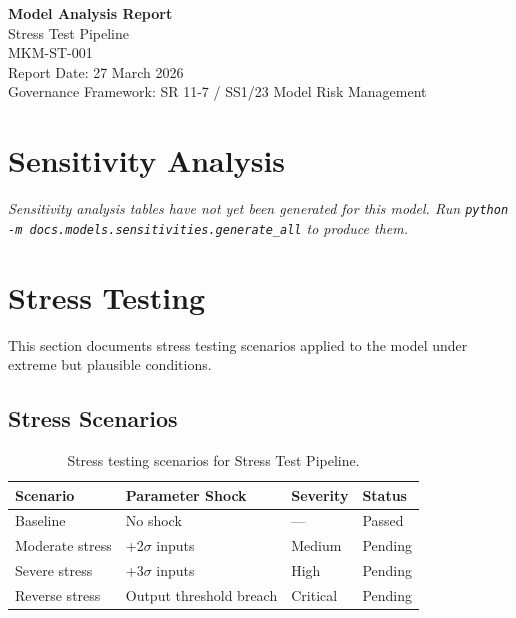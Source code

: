 \documentclass[11pt,a4paper]{article}
\begin{document}
\begin{center}
{\Large\textbf{Model Analysis Report}}\\[6pt]
{\large\textcolor{mkmblue}{Stress Test Pipeline}}\\[4pt]
{\normalsize MKM-ST-001}\\[12pt]
{\small Report Date: 27 March 2026}\\[4pt]
{\footnotesize Governance Framework: SR 11-7 / SS1/23 Model Risk Management}
\end{center}

\vspace{8mm}
\tableofcontents
\newpage

\section{Sensitivity Analysis}

\textit{Sensitivity analysis tables have not yet been generated for this model.
Run \texttt{python -m docs.models.sensitivities.generate\_all} to produce them.}


\section{Stress Testing}

This section documents stress testing scenarios applied to the model
under extreme but plausible conditions.

\subsection{Stress Scenarios}

\begin{table}[H]
    \centering
    \caption{Stress testing scenarios for Stress Test Pipeline.}
    \begin{tabular}{llll}
        \toprule
        \textbf{Scenario} & \textbf{Parameter Shock} & \textbf{Severity} & \textbf{Status} \\
        \midrule
        Baseline & No shock & --- & Passed \\
        Moderate stress & +2$\sigma$ inputs & Medium & Pending \\
        Severe stress & +3$\sigma$ inputs & High & Pending \\
        Reverse stress & Output threshold breach & Critical & Pending \\
        \bottomrule
    \end{tabular}
\end{table}
\end{document}
